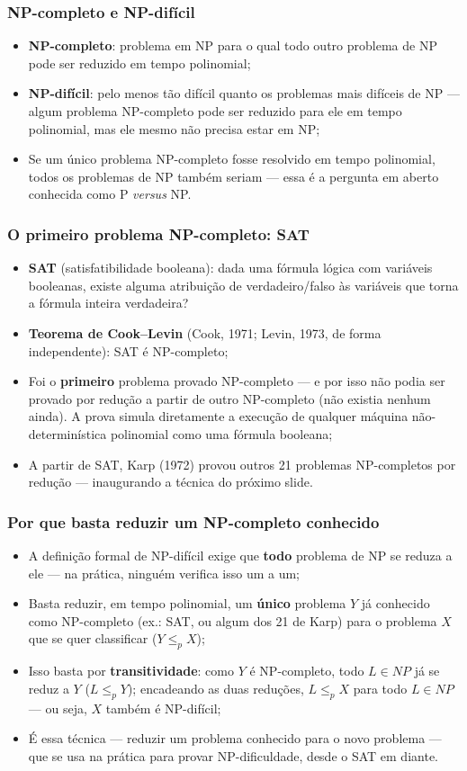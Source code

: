 \documentclass[fleqn]{beamer}
\begin{document}
\begin{frame}
	\frametitle{NP-completo e NP-difícil}
	\begin{itemize}
		\item \textbf{NP-completo}: problema em NP para o qual todo outro
			problema de NP pode ser reduzido em tempo polinomial;
		\item \textbf{NP-difícil}: pelo menos tão difícil quanto os
			problemas mais difíceis de NP — algum problema NP-completo pode
			ser reduzido para ele em tempo polinomial, mas ele mesmo não
			precisa estar em NP;
		\item Se um único problema NP-completo fosse resolvido em tempo
			polinomial, todos os problemas de NP também seriam — essa é a
			pergunta em aberto conhecida como P \textit{versus} NP.
	\end{itemize}
\end{frame}

\begin{frame}
	\frametitle{O primeiro problema NP-completo: SAT}
	\begin{itemize}
		\item \textbf{SAT} (satisfatibilidade booleana): dada uma fórmula
			lógica com variáveis booleanas, existe alguma atribuição de
			verdadeiro/falso às variáveis que torna a fórmula inteira
			verdadeira?
		\item \textbf{Teorema de Cook--Levin} (Cook, 1971; Levin, 1973,
			de forma independente): SAT é NP-completo;
		\item Foi o \textbf{primeiro} problema provado NP-completo — e por
			isso não podia ser provado por redução a partir de outro
			NP-completo (não existia nenhum ainda). A prova simula
			diretamente a execução de qualquer máquina não-determinística
			polinomial como uma fórmula booleana;
		\item A partir de SAT, Karp (1972) provou outros 21 problemas
			NP-completos por redução — inaugurando a técnica do próximo
			slide.
	\end{itemize}
\end{frame}

\begin{frame}
	\frametitle{Por que basta reduzir um NP-completo conhecido}
	\begin{itemize}
		\item A definição formal de NP-difícil exige que \textbf{todo}
			problema de NP se reduza a ele — na prática, ninguém verifica
			isso um a um;
		\item Basta reduzir, em tempo polinomial, um \textbf{único}
			problema $Y$ já conhecido como NP-completo (ex.: SAT, ou algum
			dos 21 de Karp) para o problema $X$ que se quer classificar
			($Y \leq_p X$);
		\item Isso basta por \textbf{transitividade}: como $Y$ é
			NP-completo, todo $L \in NP$ já se reduz a $Y$ ($L \leq_p Y$);
			encadeando as duas reduções, $L \leq_p X$ para todo $L \in
			NP$ — ou seja, $X$ também é NP-difícil;
		\item É essa técnica — reduzir um problema conhecido para o novo
			problema — que se usa na prática para provar NP-dificuldade,
			desde o SAT em diante.
	\end{itemize}
\end{frame}
\end{document}
